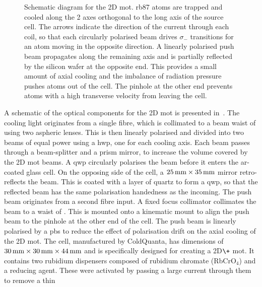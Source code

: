 \begin{figure}[!htbp]
	\centering
	\def\svgwidth{0.5\textwidth}
	
	\caption[Schematic for the 2D \ac{mot}]{Schematic diagram for the 2D \ac{mot}. \ac{rb87} atoms are trapped and cooled along the 2 axes orthogonal to the long axis of the source cell. The arrows indicate the direction of the current through each coil, so that each circularly polarised beam drives \(\sigma_-\) transitions for an atom moving in the opposite direction. A linearly polarised push beam propagates along the remaining axis and is partially reflected by the silicon wafer at the opposite end. This provides a small amount of axial cooling and the imbalance of radiation pressure pushes atoms out of the cell. The pinhole at the other end prevents atoms with a high transverse velocity from leaving the cell.}
	\label{fig:2D_mot_diagram}
\end{figure}
A schematic of the optical components for the 2D \ac{mot} is presented
in~. The cooling light originates from a single
fibre, which is collimated to a beam waist of
 using two aspheric lenses. This is then linearly polarised and divided
into two beams of equal power using a \ac{hwp}, one for each cooling axis. Each beam passes
through a beam-splitter and a prism mirror, to increase the volume covered by
the 2D \ac{mot} beams. A \ac{qwp} circularly polarises the beam before
it enters the ar-coated glass cell. On the opposing side of the cell, a
\(\sivalue{25}{\milli\metre} \times \sivalue{35}{\milli\metre}\) mirror retro-reflects the beam. This is coated with a layer of quartz to form a \ac{qwp}, so that the
reflected beam has the same polarisation handedness as the incoming.
The push beam originates from a second fibre input. A fixed focus collimator collimates
the beam to a  waist of . This is mounted onto a
 kinematic mount to align  the push beam to the  pinhole at the other end of the cell. The push beam is linearly polarised by a \ac{pbs} to reduce the effect of
polarisation drift on the axial cooling of the 2D \ac{mot}. The cell,
manufactured by ColdQuanta, has dimensions of \(\sivalue{30}{\milli\metre}
\times \sivalue{30}{\milli\metre} \times \sivalue{44}{\milli\metre}\) and is
specifically designed for creating a 2D\(\+\) \ac{mot}. It contains two rubidium
dispensers composed of rubidium chromate (RbCrO\(_4\)) and a reducing agent.
These were activated by passing a large current through them to remove a thin

